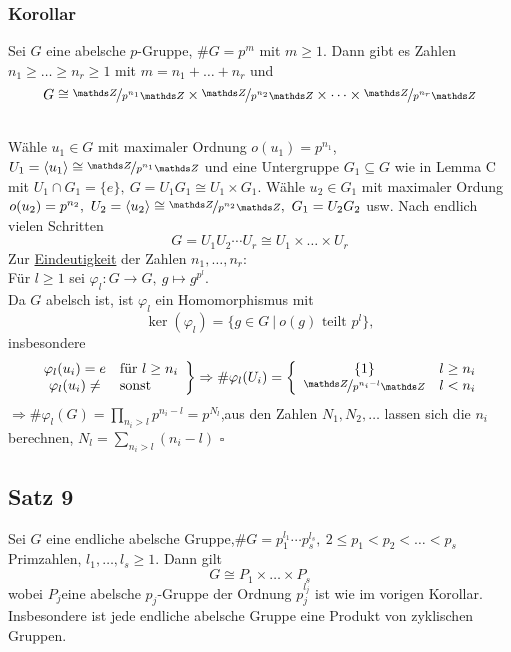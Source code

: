 \subsubsection*{Korollar}
Sei $G$ eine abelsche $p$-Gruppe, $\#G=p^m$ mit $m\ge 1$. Dann gibt es Zahlen $n_1\ge \dots \ge n_r\ge 1$ mit $m=n_1+\dots+n_r$ und \[ G\cong \nicefrac{\Z}{p^{n_1}\Z} \times \nicefrac{\Z}{p^{n_2}\Z} \times \dots \times \nicefrac{\Z}{p^{n_r}\Z} \]

\\
Wähle $u_1\in G$ mit maximaler Ordnung $o(u_1)=p^{n_1}$, $U_1=\lh{u_1}\cong \nicefrac{\Z}{p^{n_1}\Z}$ und eine Untergruppe $G_1\subseteq G$ wie in Lemma C mit $U_1\cap G_1=\{e\},~G=U_1G_1\cong U_1\times G_1$. Wähle $u_2\in G_1$ mit maximaler Ordung $o(u_2)=p^{n_2}, ~U_2=\lh{u_2}\cong \nicefrac{\Z}{p^{n_2}\Z},~ G_1=U_2G_2$ usw. Nach endlich vielen Schritten \[G=U_1U_2\cdots U_r\cong U_1\times \dots \times U_r \]
Zur \uline{Eindeutigkeit} der Zahlen $n_1,\dots,n_r$:\\
Für $l\ge 1$ sei $\varphi_l:G\to G,~g\mapsto g^{p^l}$.\\
Da $G$ abelsch ist, ist $\varphi_l$ ein Homomorphismus mit \[\ker(\varphi_l)=\{g\in G~|~o(g)\text{ teilt }p^l\}, \]
insbesondere
\[ \left.\begin{array}{cl} \varphi_l(u_i)=e & \text{für } l\ge n_i\\ \varphi_l(u_i)\not= & \text{sonst}    \end{array}\right\}\Rightarrow \#\varphi_l(U_i)=\left\{\begin{array}{cl} \{1\} & l\ge n_i\\ \nicefrac{\Z}{p^{n_i-l}\Z} & l<n_i    \end{array}\right. \]
$\Rightarrow \#\varphi_l(G)=\prod_{n_i>l}p^{n_i-l}=p^{N_l}$,aus den Zahlen $N_1,N_2,\dots$ lassen sich die $n_i$ berechnen, $N_l=\sum_{n_i>l}(n_i-l)$
\hfill $\square$

\subsection{Satz 9}
\label{sub:satz_9}
Sei $G$ eine endliche abelsche Gruppe,$\#G=p_1^{l_1}\cdots p_s^{l_s},~ 2\le p_1<p_2<\dots<p_s$ Primzahlen, $l_1,\dots,l_s\ge 1$. Dann gilt \[G\cong P_1\times \dots\times P_s \]
wobei $P_j$eine abelsche $p_j$-Gruppe der Ordnung $p_j^{l_j}$ ist wie im vorigen Korollar.\\
Insbesondere ist jede endliche abelsche Gruppe eine Produkt von zyklischen Gruppen.\\
\newpage

